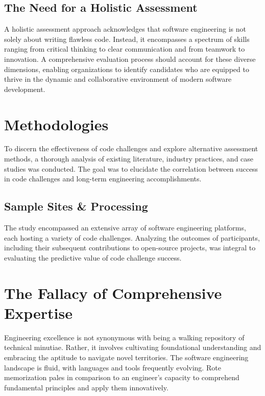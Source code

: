 \documentclass[
    a4paper, %
    10pt, %
    unnumberedsections, %
    twoside, %
]{LTJournalArticle}
\begin{document}
\subsection{The Need for a Holistic Assessment}

A holistic assessment approach acknowledges that software engineering is not solely about writing flawless code. Instead, it encompasses a spectrum of skills ranging from critical thinking to clear communication and from teamwork to innovation. A comprehensive evaluation process should account for these diverse dimensions, enabling organizations to identify candidates who are equipped to thrive in the dynamic and collaborative environment of modern software development.


\section{Methodologies}

To discern the effectiveness of code challenges and explore alternative assessment methods, a thorough analysis of existing literature, industry practices, and case studies was conducted. The goal was to elucidate the correlation between success in code challenges and long-term engineering accomplishments.

\subsection{Sample Sites \& Processing}

The study encompassed an extensive array of software engineering platforms, each hosting a variety of code challenges. Analyzing the outcomes of participants, including their subsequent contributions to open-source projects, was integral to evaluating the predictive value of code challenge success.


\section{The Fallacy of Comprehensive Expertise}

Engineering excellence is not synonymous with being a walking repository of technical minutiae. Rather, it involves cultivating foundational understanding and embracing the aptitude to navigate novel territories. The software engineering landscape is fluid, with languages and tools frequently evolving. Rote memorization pales in comparison to an engineer's capacity to comprehend fundamental principles and apply them innovatively.
\end{document}
